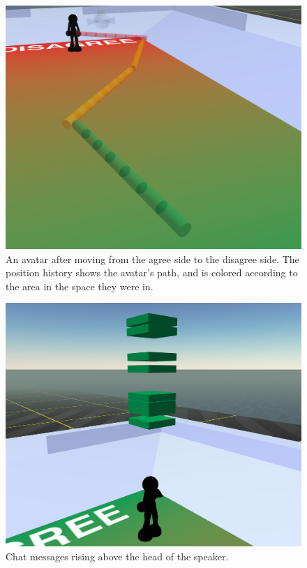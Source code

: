\begin{figure}[tp]
	\includegraphics{figures/traces-lower.png}
	\caption{An avatar after moving from the agree side to the disagree side. The position history shows the avatar's path, and is colored according to the area in the space they were in.}
	\label{fig:information_space_traces}
\end{figure}

\begin{figure}[tp]
	\includegraphics{figures/chat-history-lower.png}
	\caption{Chat messages rising above the head of the speaker.}
	\label{fig:information_space_chat}
\end{figure}

